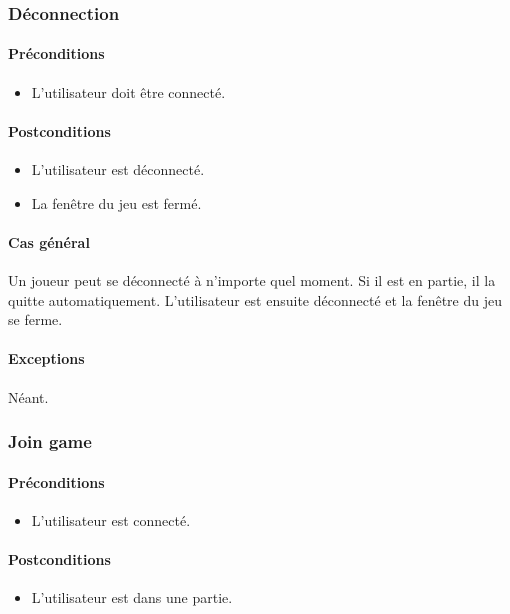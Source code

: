 \documentclass[a4paper,11pt]{report}
\begin{document}
\subsubsection{Déconnection}
\paragraph{Préconditions}
\begin{itemize}
 \item L'utilisateur doit être connecté.
\end{itemize}
\paragraph{Postconditions}
\begin{itemize}
 \item L'utilisateur est déconnecté.
 \item La fenêtre du jeu est fermé.
\end{itemize}
\paragraph{Cas général}
Un joueur peut se déconnecté à n'importe quel moment. Si il est en partie, il la quitte automatiquement. L'utilisateur
est ensuite déconnecté et la fenêtre du jeu se ferme.
\paragraph{Exceptions} Néant.
\subsubsection{Join game}
\paragraph{Préconditions}
\begin{itemize}
 \item L'utilisateur est connecté.
\end{itemize}
\paragraph{Postconditions}
\begin{itemize}
 \item L'utilisateur est dans une partie.
\end{itemize}
\end{document}
